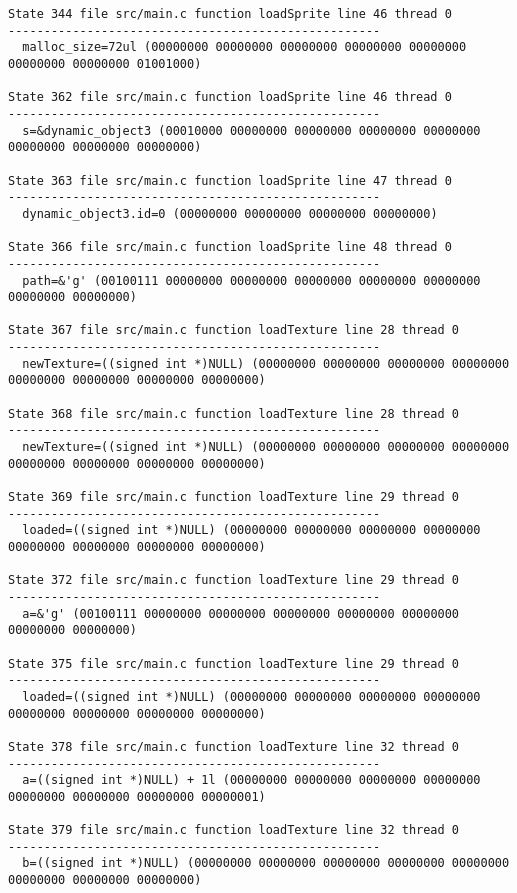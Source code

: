 \begin{verbatim}
State 344 file src/main.c function loadSprite line 46 thread 0
----------------------------------------------------
  malloc_size=72ul (00000000 00000000 00000000 00000000 00000000 00000000 00000000 01001000)

State 362 file src/main.c function loadSprite line 46 thread 0
----------------------------------------------------
  s=&dynamic_object3 (00010000 00000000 00000000 00000000 00000000 00000000 00000000 00000000)

State 363 file src/main.c function loadSprite line 47 thread 0
----------------------------------------------------
  dynamic_object3.id=0 (00000000 00000000 00000000 00000000)

State 366 file src/main.c function loadSprite line 48 thread 0
----------------------------------------------------
  path=&'g' (00100111 00000000 00000000 00000000 00000000 00000000 00000000 00000000)

State 367 file src/main.c function loadTexture line 28 thread 0
----------------------------------------------------
  newTexture=((signed int *)NULL) (00000000 00000000 00000000 00000000 00000000 00000000 00000000 00000000)

State 368 file src/main.c function loadTexture line 28 thread 0
----------------------------------------------------
  newTexture=((signed int *)NULL) (00000000 00000000 00000000 00000000 00000000 00000000 00000000 00000000)

State 369 file src/main.c function loadTexture line 29 thread 0
----------------------------------------------------
  loaded=((signed int *)NULL) (00000000 00000000 00000000 00000000 00000000 00000000 00000000 00000000)

State 372 file src/main.c function loadTexture line 29 thread 0
----------------------------------------------------
  a=&'g' (00100111 00000000 00000000 00000000 00000000 00000000 00000000 00000000)

State 375 file src/main.c function loadTexture line 29 thread 0
----------------------------------------------------
  loaded=((signed int *)NULL) (00000000 00000000 00000000 00000000 00000000 00000000 00000000 00000000)

State 378 file src/main.c function loadTexture line 32 thread 0
----------------------------------------------------
  a=((signed int *)NULL) + 1l (00000000 00000000 00000000 00000000 00000000 00000000 00000000 00000001)

State 379 file src/main.c function loadTexture line 32 thread 0
----------------------------------------------------
  b=((signed int *)NULL) (00000000 00000000 00000000 00000000 00000000 00000000 00000000 00000000)


\end{verbatim}
